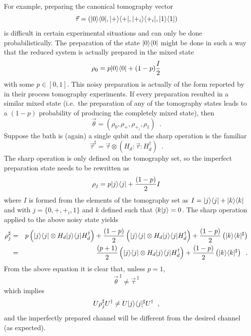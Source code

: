 \begin{example}
For example, preparing the canonical tomography vector
$$
\vec{\tau}=\left(|0\rangle\langle0|,|+\rangle\langle+|,|+_i\rangle\langle+_i|,|1\rangle\langle1|\right)
$$
is difficult in certain experimental situations and can only be done probabilistically.  The preparation of the state $|0\rangle\langle0|$ might be done in such a way that the reduced system is actually prepared in the mixed state
$$
\rho_0 = p |0\rangle\langle0| + (1-p) \frac{I}{2}
$$
with some $p\in[0,1]$.  This noisy preparation is actually of the form reported by \cite{Howard2006} in their process tomography experiments.  If every preparation resulted in a similar mixed state (i.e.\ the preparation of any of the tomography states leads to a $(1-p)$ probability of producing the completely mixed state), then
$$
\vec{\theta} = \left(\rho_0,\rho_+,\rho_{+_i},\rho_1\right)\;\;.
$$
Suppose the bath is (again) a single qubit and the sharp operation is the familiar
$$
\vec{\tau}^\sharp = \vec{\tau}\otimes \left(H_d:\vec{\tau}:H_d^\dagger\right)\;\;.
$$
The sharp operation is only defined on the tomography set, so the imperfect preparation state needs to be rewritten as
$$
\rho_j = p|j\rangle\langle j| + \frac{(1-p)}{2}I
$$
where $I$ is formed from the elements of the tomography set as $I=|j\rangle\langle j|+|k\rangle\langle k|$ and with $j=\{0,+,+_i,1\}$ and $k$ defined such that $\langle k|j\rangle=0$.  The sharp operation applied to the above noisy state yields
\begin{eqnarray*}
\rho_j^\sharp &=& p\left(|j\rangle\langle j|\otimes H_d|j\rangle\langle j|H_d^\dagger\right) + \frac{(1-p)}{2}\left(|j\rangle\langle j|\otimes H_d|j\rangle\langle j|H_d^\dagger\right)+\frac{(1-p)}{2}\left(|k\rangle\langle k|^\sharp\right)\\
&=&\frac{(p+1)}{2}\left(|j\rangle\langle j|\otimes H_d|j\rangle\langle j|H_d^\dagger\right)+\frac{(1-p)}{2}\left(|k\rangle\langle k|^\sharp\right)\;\;.
\end{eqnarray*}
From the above equation it is clear that, unless $p=1$,
$$
\vec{\theta}^{\;\sharp} \neq \vec{\tau}^{\;\sharp}
$$
which implies
$$
U\rho_j^\sharp U^\dagger \neq U|j\rangle\langle j|^\sharp U^\dagger\;\;,
$$
and the imperfectly prepared channel will be different from the desired channel (as expected).   
\end{example}

